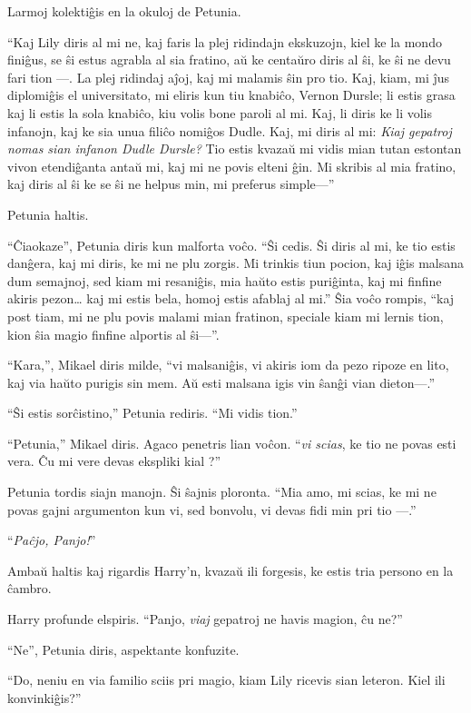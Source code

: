 Larmoj kolektiĝis en la okuloj de Petunia.

``Kaj Lily diris al mi ne, kaj faris la plej ridindajn ekskuzojn, kiel ke la
mondo finiĝus, se ŝi estus agrabla al sia fratino, aŭ ke centaŭro diris al ŝi,
ke ŝi ne devu fari tion —. La plej ridindaj aĵoj, kaj mi malamis ŝin pro tio.
Kaj, kiam, mi ĵus diplomiĝis el universitato, mi eliris kun tiu knabiĉo, Vernon
Dursle; li estis grasa kaj li estis la sola knabiĉo, kiu volis bone paroli al
mi. Kaj, li diris ke li volis infanojn, kaj ke sia unua filiĉo nomiĝos Dudle.
Kaj, mi diris al mi: \emph{Kiaj gepatroj nomas sian infanon Dudle Dursle?} Tio
estis kvazaŭ mi vidis mian tutan estontan vivon etendiĝanta antaŭ mi, kaj mi ne
povis elteni ĝin. Mi skribis al mia fratino, kaj diris al ŝi ke se ŝi ne helpus
min, mi preferus simple—''

Petunia haltis.

``Ĉiaokaze'', Petunia diris kun malforta voĉo. ``Ŝi cedis. Ŝi diris al mi, ke
tio estis danĝera, kaj mi diris, ke mi ne plu zorgis. Mi trinkis tiun pocion,
kaj iĝis malsana dum semajnoj, sed kiam mi resaniĝis, mia haŭto estis puriĝinta,
kaj mi finfine akiris pezon\ldots{} kaj mi estis bela, homoj estis afablaj al
mi.'' Ŝia voĉo rompis, ``kaj post tiam, mi ne plu povis malami mian fratinon,
speciale kiam mi lernis tion, kion ŝia magio finfine alportis al ŝi—''.

``Kara,'', Mikael diris milde, ``vi malsaniĝis, vi akiris iom da pezo ripoze en lito, kaj via haŭto purigis sin mem. Aŭ esti malsana igis vin ŝanĝi vian dieton—.''

``Ŝi estis sorĉistino,'' Petunia rediris. ``Mi vidis tion.''

``Petunia,'' Mikael diris. Agaco penetris lian voĉon. ``\emph{vi scias}, ke tio
ne povas esti vera. Ĉu mi vere devas ekspliki kial ?''

Petunia tordis siajn manojn. Ŝi ŝajnis ploronta. ``Mia amo, mi scias, ke mi ne
povas gajni argumenton kun vi, sed bonvolu, vi devas fidi min pri tio —.''

``\emph{Paĉjo, Panjo!}''

Ambaŭ haltis kaj rigardis Harry'n, kvazaŭ ili forgesis, ke estis tria persono en
la ĉambro.

Harry profunde elspiris. ``Panjo, \emph{viaj} gepatroj ne havis magion, ĉu ne?''

``Ne'', Petunia diris, aspektante konfuzite.

``Do, neniu en via familio sciis pri magio, kiam Lily ricevis sian
leteron. Kiel ili konvinkiĝis?''

